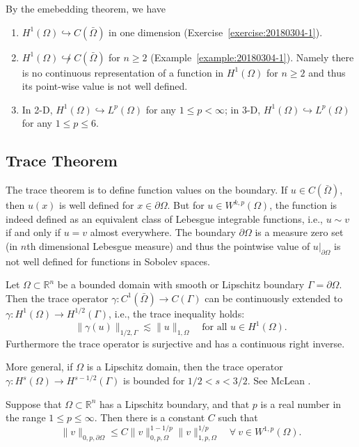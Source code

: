 \begin{exm}
By the emebedding theorem, we have
\begin{enumerate}
\item $H^1(\Omega)\hookrightarrow C(\bar{\Omega})$ in one dimension (Exercise~\ref{exercise:20180304-1}).
\item $H^1(\Omega)\not\hookrightarrow C(\bar{\Omega})$ for $n\geq2$ (Example~\ref{example:20180304-1}).
Namely there is no continuous representation of a function in $H^1(\Omega)$ for $n\geq2$ and thus its point-wise value is
not well defined.
\item In 2-D, $H^1(\Omega)\hookrightarrow L^p(\Omega)$ for any $1\leq p<\infty$; in 3-D, $H^1(\Omega)\hookrightarrow L^p(\Omega)$ for any $1\leq p\leq6$.
\end{enumerate}
\end{exm}


\subsection{Trace Theorem}
The trace theorem is to define function values on the boundary. If
$u\in C(\bar{\Omega})$, then $u(x)$ is well defined for $x\in\partial\Omega$. But for $u\in W^{k,p}(\Omega)$, the function
is indeed defined as an equivalent class of Lebesgue integrable functions, i.e., $u \sim v$ if
and only if $u = v$ almost everywhere. The boundary $\partial\Omega$ is a measure zero set (in $n$th
dimensional Lebesgue measure) and thus the pointwise value of $u|_{\partial\Omega}$ is not well defined
for functions in Sobolev spaces.

\begin{theorem}
Let $\Omega\subset\mathbb R^n$ be a bounded domain with smooth or Lipschitz boundary
$\Gamma=\partial\Omega$. Then the trace operator $\gamma: C^1(\bar{\Omega})\to C(\Gamma)$
 can be continuously extended to
$\gamma: H^1(\Omega)\to H^{1/2}(\Gamma)$, i.e., the trace inequality holds:
\[
\|\gamma(u)\|_{1/2, \Gamma}\lesssim \|u\|_{1, \Omega}\quad \textrm{for all } u\in H^1(\Omega).
\]
Furthermore the trace operator is surjective and has a continuous right inverse.
\end{theorem}

More general, if $\Omega$ is a Lipschitz domain, then the trace operator
$\gamma: H^s(\Omega)\to H^{s-1/2}(\Gamma)$ is bounded for $1/2 < s < 3/2$. See McLean \cite[pages 100-106]{McLean2000}.


\begin{theorem}
Suppose that $\Omega\subset\mathbb R^n$ has a Lipschitz boundary, and that $p$ is a real number in the range $1\leq p\leq \infty$. Then there is a constant $C$ such that
\[
\|v\|_{0, p,\partial\Omega}\leq C\|v\|_{0,p,\Omega}^{1-1/p}\|v\|_{1,p,\Omega}^{1/p}\quad\forall~v\in W^{1,p}(\Omega).
\]
\end{theorem}




